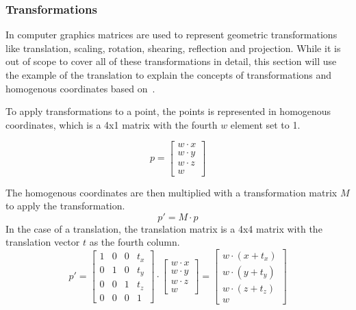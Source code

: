 \subsubsection{Transformations}

In computer graphics matrices are used to represent geometric transformations like translation, scaling, rotation,
shearing, reflection and projection.
While it is out of scope to cover all of these transformations in detail,
this section will use the example of the translation to explain the concepts of
transformations and homogenous coordinates based on~\cite{dorner_virtual_2019}.



To apply transformations to a point, the points is represented in homogenous coordinates,
which is a 4x1 matrix with the fourth $w$ element set to 1.

\begin{equation}
    p = \begin{bmatrix}
            w \cdot x \\
            w \cdot y \\
            w \cdot z \\
            w
    \end{bmatrix}
\end{equation}

The homogenous coordinates are then multiplied with a transformation matrix $M$ to apply the transformation.
\begin{equation}
    p' = M \cdot p
\end{equation}
In the case of a translation, the translation matrix is a 4x4 matrix with the translation vector $t$ as the fourth column.
\begin{equation}
    p' = \begin{bmatrix}
             1 & 0 & 0 & t_x \\
             0 & 1 & 0 & t_y \\
             0 & 0 & 1 & t_z \\
             0 & 0 & 0 & 1
    \end{bmatrix} \cdot \begin{bmatrix}
                            w \cdot x \\
                            w \cdot y \\
                            w \cdot z \\
                            w
    \end{bmatrix} = \begin{bmatrix}
                        w \cdot (x + t_x) \\
                        w \cdot (y + t_y) \\
                        w \cdot (z + t_z) \\
                        w
    \end{bmatrix}
\end{equation}


